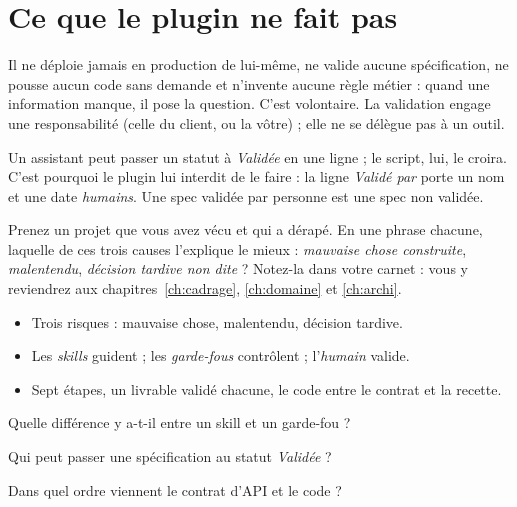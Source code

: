 \section{Ce que le plugin ne fait pas}
Il ne déploie jamais en production de lui-même, ne valide aucune spécification, ne pousse aucun
code sans demande et n'invente aucune règle métier : quand une information manque, il pose la
question. C'est volontaire. La validation engage une responsabilité (celle du client, ou la
vôtre) ; elle ne se délègue pas à un outil.

\begin{piege}
Un assistant peut passer un statut à \emph{Validée} en une ligne ; le script, lui, le croira.
C'est pourquoi le plugin lui interdit de le faire : la ligne \emph{Validé par} porte un nom et
une date \emph{humains}. Une spec validée par personne est une spec non validée.
\end{piege}

\begin{vousjouez}
Prenez un projet que vous avez vécu et qui a dérapé. En une phrase chacune, laquelle de ces trois causes
l'explique le mieux : \emph{mauvaise chose construite}, \emph{malentendu}, \emph{décision tardive non dite} ?
Notez-la dans votre carnet : vous y reviendrez aux chapitres~\ref{ch:cadrage}, \ref{ch:domaine} et \ref{ch:archi}.
\end{vousjouez}

\begin{retenir}[À retenir]
\begin{itemize}
  \item Trois risques : mauvaise chose, malentendu, décision tardive.
  \item Les \emph{skills} guident ; les \emph{garde-fous} contrôlent ; l'\emph{humain} valide.
  \item Sept étapes, un livrable validé chacune, le code entre le contrat et la recette.
\end{itemize}
\end{retenir}

\begin{acquis}
  \item Quelle différence y a-t-il entre un skill et un garde-fou ?
  \item Qui peut passer une spécification au statut \emph{Validée} ?
  \item Dans quel ordre viennent le contrat d'API et le code ?
\end{acquis}
